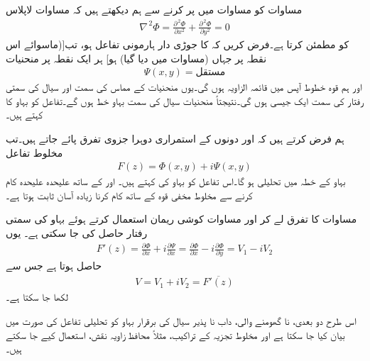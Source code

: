 مساوات  کو مساوات  میں پر کرنے سے ہم دیکھتے ہیں کہ  مساوات لاپلاس
\begin{align*}
\nabla^{\,2}\Phi=\frac{\partial^{\,2}\Phi}{\partial x^2}+\frac{\partial^{\,2}\Phi}{\partial y^2}=0
\end{align*}
کو مطمئن کرتا ہے۔فرض کریں کہ  کا جوڑی دار ہارمونی تفاعل  ہو، تب[(ماسوائے اس نقطہ پر جہاں (مساوات  میں دیا گیا)  ہو] ہر ایک نقطہ پر منحنیات
\begin{align*}
\Psi(x,y)=\text{مستقل}
\end{align*}
اور ہم قوہ خطوط  آپس میں قائمہ الزاویہ ہوں گی۔یوں  منحنیات  کے مماس کی سمت اور سیال کی سمتی رفتار کی سمت ایک جیسی ہوں گی۔نتیجتاً منحنیات  سیال کی سمت بہاو خط ہوں گے۔تفاعل  کو بہاو کا  کہتے ہیں۔

ہم فرض کرتے ہیں کہ  اور  دونوں کے استمراری دوہرا جزوی تفرق پائے جاتے ہیں۔تب مخلوط تفاعل 
\begin{align}\label{مساوات_مخفی_قوہ_مخلوط_تفاعل_مخفی_بہاو}
F(z)=\Phi(x,y)+i\Psi(x,y)
\end{align}
بہاو کے خطہ میں تحلیلی ہو گا۔اس تفاعل کو بہاو کی  کہتے ہیں۔ اور  کے ساتھ علیحدہ علیحدہ کام کرنے سے مخلوط مخفی قوہ کے ساتھ کام کرنا زیادہ آسان ثابت ہوتا ہے۔

مساوات  کا تفرق لے کر اور مساوات کوشی ریمان استعمال کرتے ہوئے بہاو کی سمتی رفتار حاصل کی جا سکتی ہے۔ یوں
\begin{align*}
F'(z)=\frac{\partial \Phi}{\partial x}+i\frac{\partial \Psi}{\partial x}=\frac{\partial \Phi}{\partial x}-i\frac{\partial \Phi}{\partial y}=V_1-iV_2
\end{align*}
حاصل ہوتا ہے جس سے
\begin{align}\label{مساوات_مخفی_قوہ_سیال_اہم_مساوات}
V=V_1+iV_2=\overline{F'(z)}
\end{align}
لکھا جا سکتا ہے۔

اس طرح دو بعدی، نا گھومنے والی، داب نا پذیر سیال کی برقرار بہاو کو تحلیلی تفاعل کی صورت میں بیان کیا جا سکتا ہے اور مخلوط تجزیہ کے تراکیب، مثلاً محافظ زاویہ نقش، استعمال کیے جا سکتے ہیں۔  

